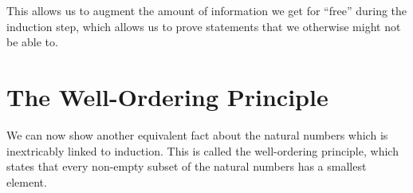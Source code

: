 \documentclass[twoside]{report}
\begin{document}
This allows us to augment the amount of information we get for ``free'' during the induction step, which allows us to prove statements that we otherwise might not be able to.


\section{The Well-Ordering Principle}

We can now show another equivalent fact about the natural numbers which is inextricably linked to induction. This is called the well-ordering principle, which states that every non-empty subset of the natural numbers has a smallest element.
\end{document}
